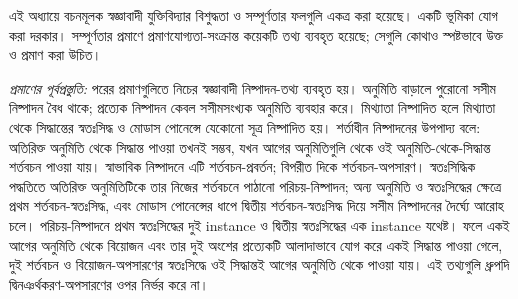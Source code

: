 \documentclass[../../../include/open-logic-chapter]{subfiles}
\begin{document}

\begin{editorial}
  এই অধ্যায়ে বচনমূলক স্বজ্ঞাবাদী যুক্তিবিদ্যার বিশুদ্ধতা ও
  সম্পূর্ণতার ফলগুলি একত্র করা হয়েছে। একটি ভূমিকা যোগ করা দরকার।
  সম্পূর্ণতার প্রমাণে প্রমাণযোগ্যতা-সংক্রান্ত কয়েকটি তথ্য ব্যবহৃত
  হয়েছে; সেগুলি কোথাও স্পষ্টভাবে উক্ত ও প্রমাণ করা উচিত।
\end{editorial}
\emph{প্রমাণের পূর্বপ্রস্তুতি:} পরের প্রমাণগুলিতে নিচের স্বজ্ঞাবাদী নিষ্পাদন-তথ্য ব্যবহৃত হয়। অনুমিতি বাড়ালে পুরোনো সসীম নিষ্পাদন বৈধ থাকে; প্রত্যেক নিষ্পাদন কেবল সসীমসংখ্যক অনুমিতি ব্যবহার করে। মিথ্যাতা নিষ্পাদিত হলে মিথ্যাতা থেকে সিদ্ধান্তের স্বতঃসিদ্ধ ও মোডাস পোনেন্সে যেকোনো সূত্র নিষ্পাদিত হয়। শর্তাধীন নিষ্পাদনের উপপাদ্য বলে: অতিরিক্ত অনুমিতি থেকে সিদ্ধান্ত পাওয়া তখনই সম্ভব, যখন আগের অনুমিতিগুলি থেকে ওই অনুমিতি-থেকে-সিদ্ধান্ত শর্তবচন পাওয়া যায়। স্বাভাবিক নিষ্পাদনে এটি শর্তবচন-প্রবর্তন; বিপরীত দিকে শর্তবচন-অপসারণ। স্বতঃসিদ্ধিক পদ্ধতিতে অতিরিক্ত অনুমিতিটিকে তার নিজের শর্তবচনে পাঠানো পরিচয়-নিষ্পাদন; অন্য অনুমিতি ও স্বতঃসিদ্ধের ক্ষেত্রে প্রথম শর্তবচন-স্বতঃসিদ্ধ, এবং মোডাস পোনেন্সের ধাপে দ্বিতীয় শর্তবচন-স্বতঃসিদ্ধ দিয়ে সসীম নিষ্পাদনের দৈর্ঘ্যে আরোহ চলে। পরিচয়-নিষ্পাদনে প্রথম স্বতঃসিদ্ধের দুই instance ও দ্বিতীয় স্বতঃসিদ্ধের এক instance যথেষ্ট। ফলে একই আগের অনুমিতি থেকে বিয়োজন এবং তার দুই অংশের প্রত্যেকটি আলাদাভাবে যোগ করে একই সিদ্ধান্ত পাওয়া গেলে, দুই শর্তবচন ও বিয়োজন-অপসারণের স্বতঃসিদ্ধে ওই সিদ্ধান্তই আগের অনুমিতি থেকে পাওয়া যায়। এই তথ্যগুলি ধ্রুপদি দ্বিনঞর্থকরণ-অপসারণের ওপর নির্ভর করে না।


\OLEndChapterHook
\end{document}
